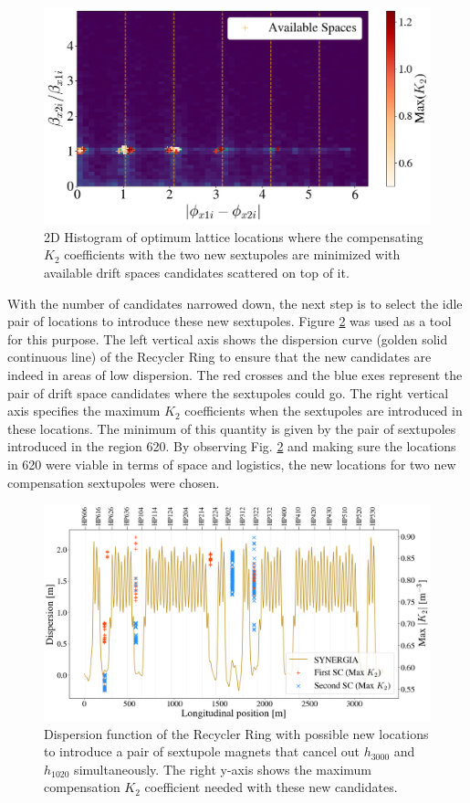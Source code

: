 \begin{figure}[H]
    \centering
    \includegraphics[width=\columnwidth]{chapter4/constrain1_avail.png}
    \caption{2D Histogram of optimum lattice locations where the compensating $K_2$ coefficients with the two new sextupoles are minimized with available drift spaces candidates scattered on top of it.}
    \label{fig:add2c2}
\end{figure}

With the number of candidates narrowed down, the next step is to select the idle pair of locations to introduce these new sextupoles. Figure \ref{fig:dxnewsexts} was used as a tool for this purpose. The left vertical axis shows the dispersion curve (golden solid continuous line) of the Recycler Ring to ensure that the new candidates are indeed in areas of low dispersion. The red crosses and the blue exes represent the pair of drift space candidates where the sextupoles could go. The right vertical axis specifies the maximum $K_2$ coefficients when the sextupoles are introduced in these locations. The minimum of this quantity is given by the pair of sextupoles introduced in the region 620. By observing Fig. \ref{fig:dxnewsexts} and making sure the locations in 620 were viable in terms of space and logistics, the new locations for two new compensation sextupoles were chosen. 

\begin{figure}[H]
    \centering
    \includegraphics[width=\columnwidth]{chapter4/new_sexts_dx.png}
    \caption{Dispersion function of the Recycler Ring with possible new locations to introduce a pair of sextupole magnets that cancel out $h_{3000}$ and $h_{1020}$ simultaneously. The right y-axis shows the maximum compensation $K_2$ coefficient needed with these new candidates.}
    \label{fig:dxnewsexts}
\end{figure}

